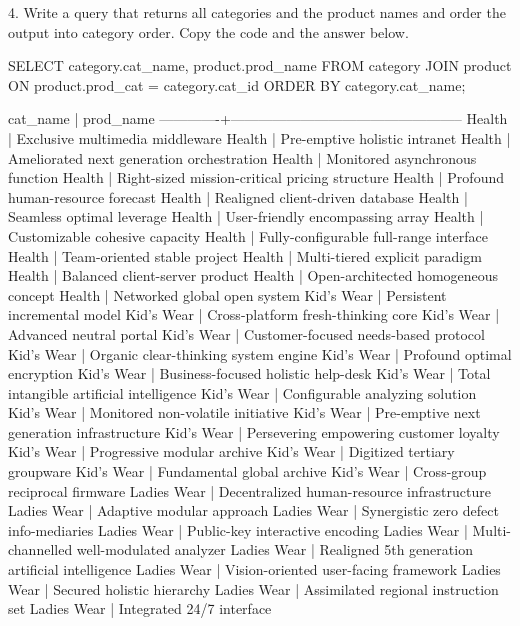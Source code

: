 4. Write a query that returns all categories and the product names and order the output into category order. Copy the code and the answer below.
\begin{sql}
SELECT category.cat_name, product.prod_name FROM category
JOIN product ON product.prod_cat = category.cat_id
ORDER BY category.cat_name;
\end{sql}
\begin{pseudo*}
  cat_name   |                    prod_name
-------------+--------------------------------------------------
 Health      | Exclusive multimedia middleware
 Health      | Pre-emptive holistic intranet
 Health      | Ameliorated next generation orchestration
 Health      | Monitored asynchronous function
 Health      | Right-sized mission-critical pricing structure
 Health      | Profound human-resource forecast
 Health      | Realigned client-driven database
 Health      | Seamless optimal leverage
 Health      | User-friendly encompassing array
 Health      | Customizable cohesive capacity
 Health      | Fully-configurable full-range interface
 Health      | Team-oriented stable project
 Health      | Multi-tiered explicit paradigm
 Health      | Balanced client-server product
 Health      | Open-architected homogeneous concept
 Health      | Networked global open system
 Kid's Wear  | Persistent incremental model
 Kid's Wear  | Cross-platform fresh-thinking core
 Kid's Wear  | Advanced neutral portal
 Kid's Wear  | Customer-focused needs-based protocol
 Kid's Wear  | Organic clear-thinking system engine
 Kid's Wear  | Profound optimal encryption
 Kid's Wear  | Business-focused holistic help-desk
 Kid's Wear  | Total intangible artificial intelligence
 Kid's Wear  | Configurable analyzing solution
 Kid's Wear  | Monitored non-volatile initiative
 Kid's Wear  | Pre-emptive next generation infrastructure
 Kid's Wear  | Persevering empowering customer loyalty
 Kid's Wear  | Progressive modular archive
 Kid's Wear  | Digitized tertiary groupware
 Kid's Wear  | Fundamental global archive
 Kid's Wear  | Cross-group reciprocal firmware
 Ladies Wear | Decentralized human-resource infrastructure
 Ladies Wear | Adaptive modular approach
 Ladies Wear | Synergistic zero defect info-mediaries
 Ladies Wear | Public-key interactive encoding
 Ladies Wear | Multi-channelled well-modulated analyzer
 Ladies Wear | Realigned 5th generation artificial intelligence
 Ladies Wear | Vision-oriented user-facing framework
 Ladies Wear | Secured holistic hierarchy
 Ladies Wear | Assimilated regional instruction set
 Ladies Wear | Integrated 24/7 interface

\end{pseudo*}
